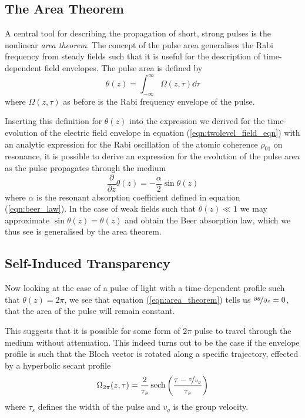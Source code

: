   \subsection{The Area Theorem}  

    A central tool for describing the propagation of short, strong pulses is the
    nonlinear \textit{area theorem}\cite{McCall1969}. The concept of the pulse
    area generalises the Rabi frequency from steady fields such that it is
    useful for the description of time-dependent field envelopes. The
    pulse area is defined by
    \begin{equation}
      \theta(z) = \int^{\infty}_{-\infty} \Omega(z, \tau) \dd \tau
      \label{eqn:pulse_area}
    \end{equation}
    where $\Omega(z, \tau)$ as before is the Rabi frequency envelope of the
    pulse.

    Inserting this definition for $\theta(z)$ into the expression we derived for
    the time-evolution of the electric field envelope in equation
    (\ref{eqn:twolevel_field_eqn}) with an analytic expression for the Rabi
    oscillation of the atomic coherence $\rho_{01}$ on resonance, it is
    possible\cite{McCall1969} to derive an expression for the evolution of the
    pulse area as the pulse propagates through the medium
    \begin{equation}
      \frac{\partial}{\partial z} \theta(z) = -\frac{\alpha}{2} \sin{\theta(z)}
      \label{eqn:area_theorem}
    \end{equation}
    where $\alpha$ is the resonant absorption coefficient defined in equation
    (\ref{eqn:beer_law}). In the case of weak fields such that $\theta(z) \ll 1$
    we may approximate $\sin{\theta(z)} = \theta(z)$ and obtain the Beer absorption
    law, which we thus see is generalised by the area theorem.

  \subsection{Self-Induced Transparency} 

    Now looking at the case of a pulse of light with a time-dependent profile
    such that $\theta(z) = 2\pi$, we see that equation (\ref{eqn:area_theorem})
    tells us $\nicefrac{\partial \theta}{\partial z} = 0$, \ie that the area of
    the pulse will remain constant.

    This suggests that it is possible for some form of $2\pi$ pulse to travel
    through the medium without attenuation. This indeed turns out to be the case
    if the envelope profile is such that the Bloch vector is rotated along
    a specific trajectory, effected by a hyperbolic secant profile
    \begin{equation}
      \Omega_{2\pi}(z, \tau) = \frac{2}{\tau_{s}} 
          \operatorname{sech}\left(\frac{\tau - \nicefrac{z}{v_g}}{\tau_s}\right)
      \label{eqn:sech_shape}
    \end{equation}
    where $\tau_s$ defines the width of the pulse and $v_g$ is the group
    velocity.

